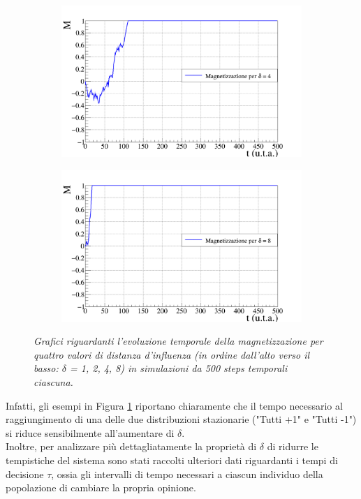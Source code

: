 \documentclass[letterpaper,10pt]{article}
\begin{document}
\begin{figure}
\ContinuedFloat
\centering
\begin{subfigure}{0.8\textwidth}
\includegraphics[width=\linewidth]{magn_graph_d4.png}
\end{subfigure}
\begin{subfigure}{0.8\textwidth}
\includegraphics[width=\linewidth]{magn_graph_d8.png}
\end{subfigure}
\caption{\textit{Grafici riguardanti l'evoluzione temporale della magnetizzazione per quattro valori di distanza d'influenza (in ordine dall'alto verso il basso: $\delta$ = 1, 2, 4, 8) in simulazioni da 500 steps temporali ciascuna.}}
\label{Fig:9}
\end{figure}

Infatti, gli esempi in Figura \ref{Fig:9} riportano chiaramente che il tempo necessario al raggiungimento di una delle due distribuzioni stazionarie ("Tutti +1" e "Tutti -1") si riduce sensibilmente all'aumentare di $\delta$.
\\ Inoltre, per analizzare più dettagliatamente la proprietà di $\delta$ di ridurre le tempistiche del sistema sono stati raccolti ulteriori dati riguardanti i tempi di decisione $\tau$, ossia gli intervalli di tempo necessari a ciascun individuo della popolazione di cambiare la propria opinione.
\end{document}
